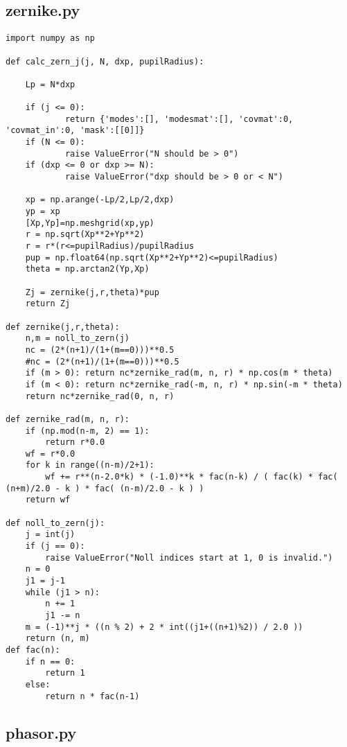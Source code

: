 \subsection{zernike.py}
\label{subapp:zernike}

\begin{lstlisting}
import numpy as np

def calc_zern_j(j, N, dxp, pupilRadius):

    Lp = N*dxp

    if (j <= 0):
    		return {'modes':[], 'modesmat':[], 'covmat':0, 'covmat_in':0, 'mask':[[0]]}
    if (N <= 0):
    		raise ValueError("N should be > 0")
    if (dxp <= 0 or dxp >= N):
    		raise ValueError("dxp should be > 0 or < N")

    xp = np.arange(-Lp/2,Lp/2,dxp)
    yp = xp
    [Xp,Yp]=np.meshgrid(xp,yp) 
    r = np.sqrt(Xp**2+Yp**2)
    r = r*(r<=pupilRadius)/pupilRadius
    pup = np.float64(np.sqrt(Xp**2+Yp**2)<=pupilRadius)
    theta = np.arctan2(Yp,Xp)

    Zj = zernike(j,r,theta)*pup
    return Zj

def zernike(j,r,theta):
    n,m = noll_to_zern(j)
    nc = (2*(n+1)/(1+(m==0)))**0.5
    #nc = (2*(n+1)/(1+(m==0)))**0.5
    if (m > 0): return nc*zernike_rad(m, n, r) * np.cos(m * theta)
    if (m < 0): return nc*zernike_rad(-m, n, r) * np.sin(-m * theta)
    return nc*zernike_rad(0, n, r)

def zernike_rad(m, n, r):
    if (np.mod(n-m, 2) == 1):
        return r*0.0
    wf = r*0.0
    for k in range((n-m)/2+1):
        wf += r**(n-2.0*k) * (-1.0)**k * fac(n-k) / ( fac(k) * fac( (n+m)/2.0 - k ) * fac( (n-m)/2.0 - k ) )
    return wf

def noll_to_zern(j):   
    j = int(j)
    if (j == 0):
        raise ValueError("Noll indices start at 1, 0 is invalid.")
    n = 0
    j1 = j-1
    while (j1 > n):
        n += 1
        j1 -= n
    m = (-1)**j * ((n % 2) + 2 * int((j1+((n+1)%2)) / 2.0 ))
    return (n, m)
def fac(n):
    if n == 0:
        return 1
    else:
        return n * fac(n-1)

\end{lstlisting}

\subsection{phasor.py}
\label{subapp:phasor}

